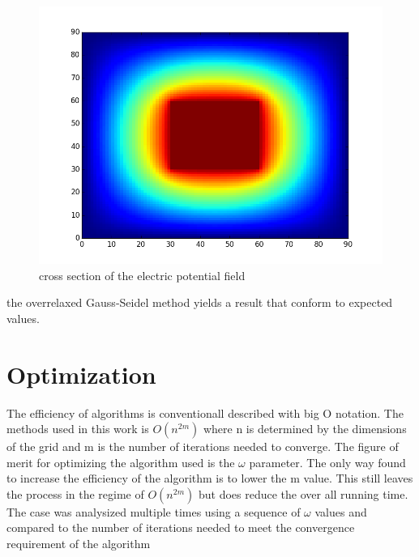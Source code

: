 \documentclass[aps,prb,twocolumn,amsfonts,showpacs,letterpaper]{revtex4}
\begin{document}
\begin{figure}[H]
\centering
\includegraphics[scale=0.35]{voltage.png}
\caption{cross section of the electric potential field}
\label{Voltage}
\end{figure}

the overrelaxed Gauss-Seidel method yields a result that conform to expected values.

\section{Optimization}
The efficiency of algorithms is conventionall described with big O notation. The methods used in this work is $O(n^{2m})$ where n is determined by the dimensions of the grid and m is the number of iterations needed to converge. The figure of merit for optimizing the algorithm used is the $\omega$ parameter. The only way found to increase the efficiency of the algorithm is to lower the m value. This still leaves the process in the regime of $O(n^{2m})$ but does reduce the over all running time. The case was analysized multiple times using a sequence of $\omega$ values and compared to the number of iterations needed to meet the convergence requirement of the algorithm
\end{document}
